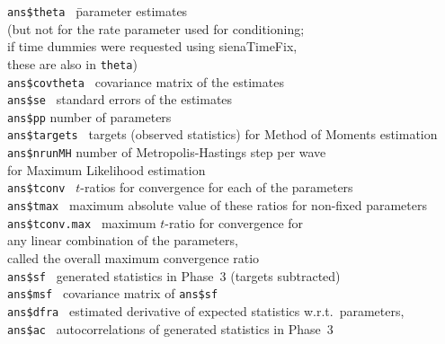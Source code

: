 \documentclass[a4paper,fleqn,11pt]{article}
\newcommand{\+}{\, + \,}
\begin{document}
\begin{tabbing}
 \texttt{ans\$theta  }\hspace{3em}    \=  parameter estimates  \\
                                      \> (but not for the rate parameter used
                                                       for conditioning;\\
                                      \> if time dummies were requested using
                                            \textsf{sienaTimeFix},\\
                                      \> these are also in \texttt{theta}) \\
 \texttt{ans\$covtheta   }            \> covariance matrix of the estimates \\
 \texttt{ans\$se   }               \> standard errors of the estimates \\
 \texttt{ans\$pp}                     \> number of parameters  \\
 \texttt{ans\$targets }               \> targets (observed statistics)
                                         for Method of Moments estimation  \\
 \texttt{ans\$nrunMH}               \> number of Metropolis-Hastings step per wave \\
                                      \> for Maximum Likelihood estimation\\
 \texttt{ans\$tconv   }               \> $t$-ratios for convergence for  each of the parameters\\
 \texttt{ans\$tmax   }               \> maximum absolute value of these ratios for non-fixed parameters\\
 \texttt{ans\$tconv.max   }         \> maximum $t$-ratio for convergence for \\
                                 \> any linear combination of the parameters,\\
                             \> called the overall maximum convergence ratio \\
 \texttt{ans\$sf    }        \>  generated statistics in Phase~3 (targets subtracted)\\
 \texttt{ans\$msf   }        \>  covariance matrix of
                                           \texttt{ans\$sf    } \\
 \texttt{ans\$dfra  }        \> estimated derivative of expected
                                            statistics w.r.t.\ parameters,  \\
 \texttt{ans\$ac  }        \> autocorrelations of generated statistics in Phase~3  \\

\end{tabbing}
\end{document}

